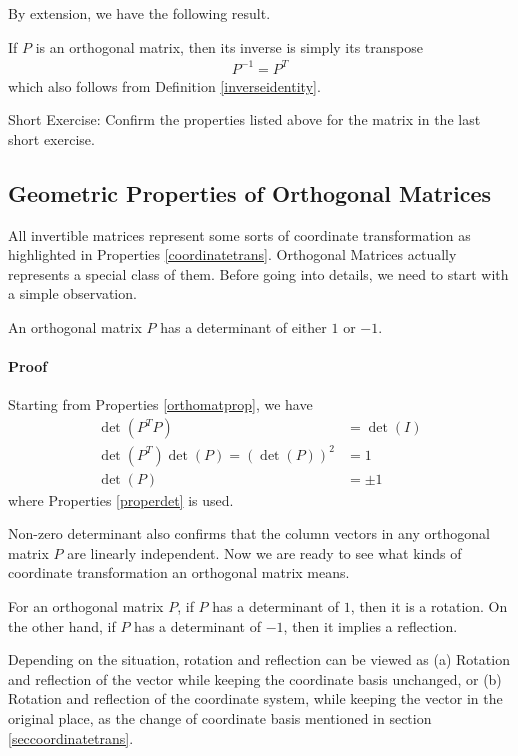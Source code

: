 By extension, we have the following result.
\begin{proper}
\label{orthoinvT}
If $P$ is an orthogonal matrix, then its inverse is simply its transpose
\begin{align*}
P^{-1} = P^T   
\end{align*}
which also follows from Definition \ref{inverseidentity}.
\end{proper}
Short Exercise: Confirm the properties listed above for the matrix in the last short exercise.

\subsection{Geometric Properties of Orthogonal Matrices}
\label{orthogeometricsub}
All invertible matrices represent some sorts of coordinate transformation as highlighted in Properties \ref{coordinatetrans}. Orthogonal Matrices actually represents a special class of them. Before going into details, we need to start with a simple observation.
\begin{proper}
An orthogonal matrix $P$ has a determinant of either $1$ or $-1$.
\paragraph{Proof} Starting from Properties \ref{orthomatprop}, we have
\begin{align*}
\det(P^TP) &= \det(I) \\
\det(P^T)\det(P) = (\det(P))^2& = 1\\
\det(P) &= \pm 1
\end{align*}
where Properties \ref{properdet} is used.
\end{proper}
Non-zero determinant also confirms that the column vectors in any orthogonal matrix $P$ are linearly independent. Now we are ready to see what kinds of coordinate transformation an orthogonal matrix means.
\begin{thm}
For an orthogonal matrix $P$, if $P$ has a determinant of $1$, then it is a rotation. On the other hand, if $P$ has a determinant of $-1$, then it implies a reflection.
\end{thm}

Depending on the situation, rotation and reflection can be viewed as (a) Rotation and reflection of the vector while keeping the coordinate basis unchanged, or (b) Rotation and reflection of the coordinate system, while keeping the vector in the original place, as the change of coordinate basis mentioned in section \ref{seccoordinatetrans}.

